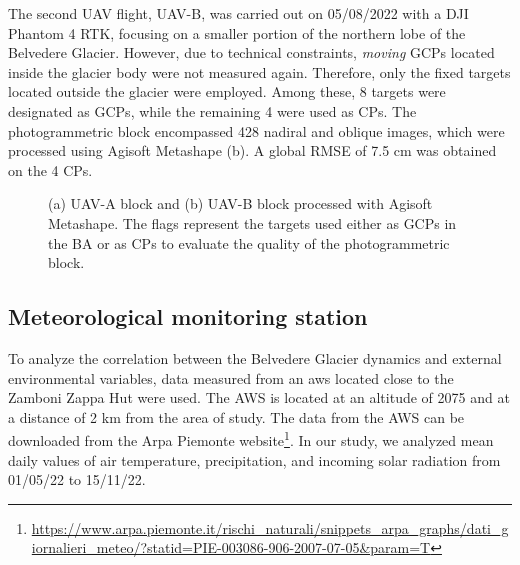The second UAV flight, UAV-B, was carried out on 05/08/2022 with a DJI Phantom 4 RTK, focusing on a smaller portion of the northern lobe of the Belvedere Glacier.
However, due to technical constraints, \textit{moving} GCPs located inside the glacier body were not measured again.
Therefore, only the fixed targets located outside the glacier were employed.
Among these, 8 targets were designated as GCPs, while the remaining 4 were used as CPs.
The photogrammetric block encompassed 428 nadiral and oblique images, which were processed using Agisoft Metashape (b).
A global RMSE of 7.5 cm was obtained on the 4 CPs.

\begin{figure}
  \centering
  \caption{(a) UAV-A block and (b) UAV-B block processed with Agisoft Metashape. The
    flags represent the targets used either as GCPs in the BA or as CPs to evaluate the
    quality of the photogrammetric block.}
  \label{fig:4:uavblocks}
\end{figure}

\subsection{Meteorological monitoring station}\label{sec:4:meteostation}

To analyze the correlation between the Belvedere Glacier dynamics and external environmental variables, data measured from an \ac{aws}
located close to the Zamboni Zappa Hut were used. 
The AWS is located at an altitude of \SI{2075}{\masl} and at a distance of 2 km from the area of study.
The data from the AWS can be downloaded from the Arpa Piemonte website\footnote{\url{https://www.arpa.piemonte.it/rischi_naturali/snippets_arpa_graphs/dati_giornalieri_meteo/?statid=PIE-003086-906-2007-07-05&param=T}}.
In our study, we analyzed mean daily values of air temperature, precipitation, and incoming solar radiation from 01/05/22 to 15/11/22.

